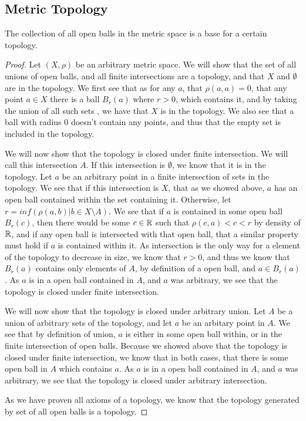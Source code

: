 \subsection{Metric Topology}

\begin{majorEx}%
    The collection of all open balls in the metric space is a base for a certain
    topology.
\end{majorEx}

\begin{proof}
 Let $(X,\rho)$ be an arbitrary
 metric space. We will show that the set of all unions of open balls, and all
  finite intersections are a topology, and that $X$ and $\emptyset$
  are in the topology. We first see that as for any $a$, that $\rho(a,a)=0$,
  that any point $a\in X$ there is a ball $B_r(a)$ where $r>0$, 
  which contains it, and by taking the union of all such sets , we
  have that $X$ is in the topology.
  We also see that a ball with radius $0$ doesn't contain any points,
  and thus that the empty set is included in the topology. 

  We will now show that the topology is closed under finite
  intersection. We will call this intersection $A$. If this
  intersection is $\emptyset$, we know that it 
  is in the topology. Let $a$ be an arbitrary point in a finite intersection
  of sets in the topology. We see that if this intersection is $X$,
  that as we showed above, $a$ has an open ball contained within the
  set containing it. Otherwise, let $r= inf (\rho(a,b)| b \in X
  \setminus A)$. We see that if $a$ is contained in some open ball
  $B_r(c)$, then there would  be some $c\in \mathbb{R}$ such that
  $\rho(c,a)<c<r$ by density of $\mathbb{R}$, 
  and if any open ball is intersected with that open ball, that a
  similar property must hold if $a$ is contained within it. As
  intersection is the only way for a element of the topology to
  decrease in size, we know that $r>0$, and thus we know that $B_r(a)$
  contains only elements of $A$, by definition of a open ball, and
  $a\in B_r(a)$. As $a$ is in a open ball contained in $A$, and $a$ was arbitrary, we
  see that the topology is closed under finite intersection.

  We will now show that the topology is closed under arbitrary
  union. Let $A$ be a union of arbitrary sets of the topology, and let
  $a$ be an arbitary point in $A$. We see that by definition of union,
  $a$ is either in some open ball within, or in the finite intersection of
  open balls. Because we showed above that the topology is closed
  under finite intersection, we know that in both cases, that there is
  some open ball in $A$ which contains $a$. As $a$ is in a open ball 
  contained in $A$, and $a$ was arbitrary, we see that the topology is
  closed under arbitrary intersection.
  
  As we have proven all axioms of a topology, we know that the
  topology generated by set of all open balls is a topology.
\end{proof}

